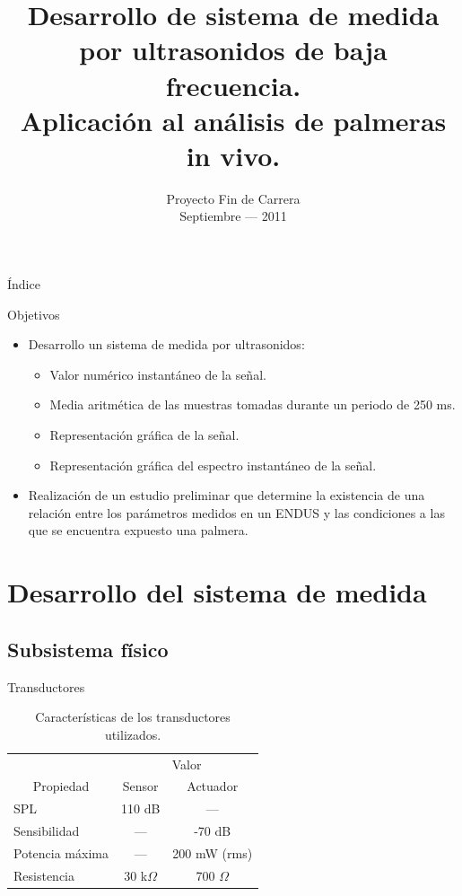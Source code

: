 \documentclass[utf8, compress]			{beamer}
\title[ENDUS: Sistema de medida y aplicación en palmeras in vivo.]{
    Desarrollo de sistema de medida por ultrasonidos de baja frecuencia. \\
    Aplicación al análisis de palmeras in vivo.
}
\author[José Ramón Gisbert Valls]{
    \vbox{
	\makebox[\director][r]{AUTOR: José Ramón Gisbert Valls}
	\makebox[\director][r]{DIRECTOR: Alberto Rodríguez Martínez}
    }
}
\institute[Universidad Miguel Hernández de Elche]{
    Universidad Miguel Hernández de Elche \medskip\par
    Escuela Politécnica Superior de Elche
}
\date[Septiembre --- 2011]{
    Proyecto Fin de Carrera \\
    Septiembre --- 2011
}
\begin{document}
\frame[plain]{\titlepage}

\begin{frame}{Índice}
    \tableofcontents
\end{frame}

\begin{frame}{Objetivos}
    \begin{itemize}
	\item Desarrollo un sistema de medida por ultrasonidos:
	    \begin{itemize}
		\item Valor numérico instantáneo de la señal.
		\item Media aritmética de las muestras tomadas durante un
		    periodo de 250 ms.
		\item Representación gráfica de la señal.
		\item Representación gráfica del espectro instantáneo de la
		    señal.
	    \end{itemize}
	\item Realización de un estudio preliminar que determine la
	    existencia de una relación entre los parámetros medidos en un
	    ENDUS y las condiciones a las que se encuentra expuesto una
	    palmera.
    \end{itemize}
\end{frame}


\section{Desarrollo del sistema de medida}

\subsection{Subsistema físico}

\begin{frame}{Transductores}
    \begin{table} 
	\centering
	\begin{tabular}{l c c}
	    \toprule
	    & \multicolumn{2}{c}{Valor} \\
	    \cmidrule(r){2-3}
	    \multicolumn{1}{c}{Propiedad} &
	    \multicolumn{1}{c}{Sensor} &
	    \multicolumn{1}{c}{Actuador} \\
	    \midrule
	    SPL & 110 dB & --- \\
	    Sensibilidad & --- & -70 dB \\
	    Potencia máxima & --- & 200
	    mW (rms) \\
	    Resistencia & 30 k$\Omega$
	    & 700 $\Omega$ \\
	    \bottomrule
	\end{tabular}
	\caption{Características de los transductores utilizados.}
	\label{tab:trasnducers}
    \end{table}
\end{frame}
\end{document}
